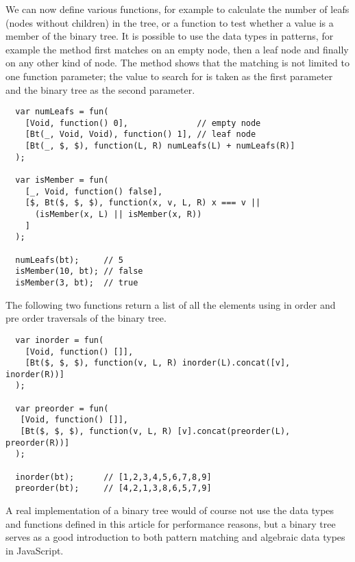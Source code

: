 We can now define various functions, for example to calculate the number of leafs (nodes without children) in the tree, or a function to test whether a value is a member of the binary tree. It is possible to use the data types in patterns, for example the  method first matches on an empty node, then a leaf node and finally on any other kind of node. The  method shows that the matching is not limited to one function parameter; the value to search for is taken as the first parameter and the binary tree as the second parameter.
\begin{verbatim}
  var numLeafs = fun(
    [Void, function() 0],              // empty node
    [Bt(_, Void, Void), function() 1], // leaf node
    [Bt(_, $, $), function(L, R) numLeafs(L) + numLeafs(R)]
  );

  var isMember = fun(
    [_, Void, function() false],
    [$, Bt($, $, $), function(x, v, L, R) x === v || 
      (isMember(x, L) || isMember(x, R))
    ]
  );

  numLeafs(bt);     // 5
  isMember(10, bt); // false
  isMember(3, bt);  // true
\end{verbatim}
The following two functions return a list of all the elements using in order and pre order traversals of the binary tree.
\begin{verbatim}
  var inorder = fun(
    [Void, function() []],
    [Bt($, $, $), function(v, L, R) inorder(L).concat([v], inorder(R))]
  );

  var preorder = fun(
   [Void, function() []],
   [Bt($, $, $), function(v, L, R) [v].concat(preorder(L), preorder(R))]
  );

  inorder(bt);      // [1,2,3,4,5,6,7,8,9]
  preorder(bt);     // [4,2,1,3,8,6,5,7,9]
\end{verbatim}
A real implementation of a binary tree would of course not use the data types and functions defined in this article for performance reasons, but a binary tree serves as a good introduction to both pattern matching and algebraic data types in JavaScript.
